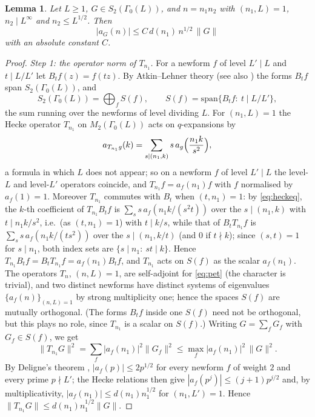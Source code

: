 \documentclass[11pt]{amsart}
\newtheorem{lemma}[theorem]{Lemma}
\theoremstyle{remark}
\begin{document}
\begin{lemma}\label{lem:hecke}
Let $L\ge1$, $G\in S_2(\Gamma_0(L))$, and $n=n_1n_2$ with $(n_1,L)=1$, $n_2\mid L^\infty$ and $n_2\le L^{1/2}$. Then
\[
|a_G(n)|\le C\,d(n_1)\,n^{1/2}\,\|G\|
\]
with an absolute constant $C$.
\end{lemma}
\begin{proof}
\emph{Step 1: the operator norm of $T_{n_1}$.} For a newform $f$ of level $L'\mid L$ and $t\mid L/L'$ let $B_tf(z)=f(tz)$. By Atkin--Lehner theory \cite{AL} (see also \cite[Sections~6.6--6.7]{IwaTopics}) the forms $B_tf$ span $S_2(\Gamma_0(L))$, and
\[
S_2(\Gamma_0(L))=\bigoplus_{f}S(f),\qquad S(f)=\mathrm{span}\{B_tf:\ t\mid L/L'\},
\]
the sum running over the newforms of level dividing $L$. For $(n_1,L)=1$ the Hecke operator $T_{n_1}$ on $M_2(\Gamma_0(L))$ acts on $q$-expansions by
\begin{equation}\label{eq:heckeq}
a_{T_{n_1}g}(k)=\sum_{s\mid(n_1,k)}s\,a_g\Bigl(\frac{n_1k}{s^2}\Bigr),
\end{equation}
a formula in which $L$ does not appear; so on a newform $f$ of level $L'\mid L$ the level-$L$ and level-$L'$ operators coincide, and $T_{n_1}f=a_f(n_1)f$ with $f$ normalised by $a_f(1)=1$. Moreover $T_{n_1}$ commutes with $B_t$ when $(t,n_1)=1$: by \eqref{eq:heckeq}, the $k$-th coefficient of $T_{n_1}B_tf$ is $\sum_s s\,a_f(n_1k/(s^2t))$ over the $s\mid(n_1,k)$ with $t\mid n_1k/s^2$, i.e.\ (as $(t,n_1)=1$) with $t\mid k/s$, while that of $B_tT_{n_1}f$ is $\sum_s s\,a_f(n_1k/(ts^2))$ over the $s\mid(n_1,k/t)$ (and $0$ if $t\nmid k$); since $(s,t)=1$ for $s\mid n_1$, both index sets are $\{s\mid n_1:\ st\mid k\}$. Hence $T_{n_1}B_tf=B_tT_{n_1}f=a_f(n_1)B_tf$, and $T_{n_1}$ acts on $S(f)$ as the scalar $a_f(n_1)$. The operators $T_n$, $(n,L)=1$, are self-adjoint for \eqref{eq:pet} (the character is trivial), and two distinct newforms have distinct systems of eigenvalues $\{a_f(n)\}_{(n,L)=1}$ by strong multiplicity one; hence the spaces $S(f)$ are mutually orthogonal. (The forms $B_tf$ inside one $S(f)$ need not be orthogonal, but this plays no role, since $T_{n_1}$ is a scalar on $S(f)$.) Writing $G=\sum_fG_f$ with $G_f\in S(f)$, we get
\[
\|T_{n_1}G\|^2=\sum_f|a_f(n_1)|^2\|G_f\|^2\le\max_f|a_f(n_1)|^2\,\|G\|^2.
\]
By Deligne's theorem \cite{Deligne}, $|a_f(p)|\le2p^{1/2}$ for every newform $f$ of weight $2$ and every prime $p\nmid L'$; the Hecke relations then give $|a_f(p^j)|\le(j+1)p^{j/2}$ and, by multiplicativity, $|a_f(n_1)|\le d(n_1)n_1^{1/2}$ for $(n_1,L')=1$. Hence $\|T_{n_1}G\|\le d(n_1)n_1^{1/2}\|G\|$.


\end{proof}
\end{document}
